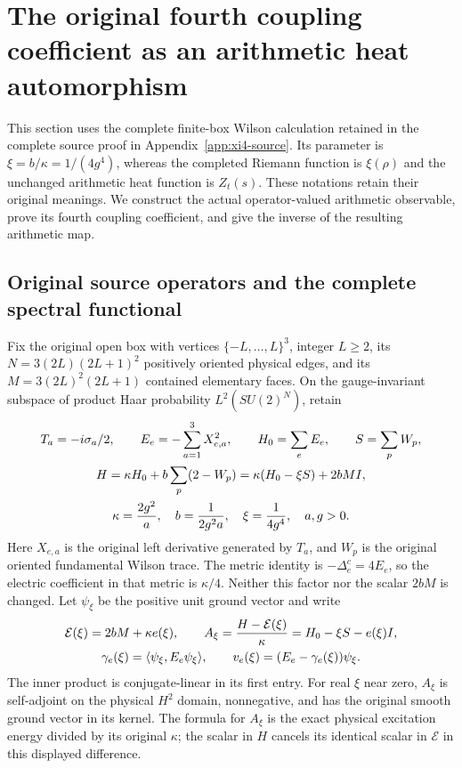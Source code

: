 \section{The original fourth coupling coefficient as an arithmetic heat automorphism}
\label{sec:x4-arithmetic}

This section uses the complete finite-box Wilson calculation retained in
the complete source proof in Appendix~\ref{app:xi4-source}. Its parameter is
\(\xi=b/\kappa=1/(4g^4)\), whereas the completed Riemann function is
\(\xi(\rho)\) and the unchanged arithmetic heat function is \(Z_t(s)\).
These notations retain their original meanings. We construct the actual
operator-valued arithmetic observable, prove its fourth coupling
coefficient, and give the inverse of the resulting arithmetic map.

\subsection{Original source operators and the complete spectral functional}

Fix the original open box with vertices \(\{-L,\ldots,L\}^3\),
integer \(L\geq2\), its \(N=3(2L)(2L+1)^2\) positively oriented
physical edges, and its \(M=3(2L)^2(2L+1)\) contained elementary
faces. On the gauge-invariant subspace of product Haar probability
\(L^2(SU(2)^N)\), retain
\begin{gather}
T_a=-i\sigma_a/2,\qquad E_e=-\sum_{a=1}^3X_{e,a}^2,\qquad
H_0=\sum_eE_e,\qquad S=\sum_pW_p,\notag\\
H=\kappa H_0+b\sum_p(2-W_p)
 =\kappa(H_0-\xi S)+2bMI,\notag\\
\kappa=\frac{2g^2}{a},\quad b=\frac1{2g^2a},\quad
\xi=\frac1{4g^4},\quad a,g>0.
\label{xat:original-H}
\end{gather}
Here \(X_{e,a}\) is the original left derivative generated by
\(T_a\), and \(W_p\) is the original oriented fundamental Wilson
trace. The metric identity is \(-\Delta_e^c=4E_e\), so the electric
coefficient in that metric is \(\kappa/4\). Neither this factor nor
the scalar \(2bM\) is changed. Let \(\psi_\xi\) be the positive
unit ground vector and write
\begin{gather}
\mathcal E(\xi)=2bM+\kappa e(\xi),\qquad
A_\xi=\frac{H-\mathcal E(\xi)}{\kappa}
      =H_0-\xi S-e(\xi)I,\notag\\
\gamma_e(\xi)=\langle\psi_\xi,E_e\psi_\xi\rangle,\qquad
v_e(\xi)=(E_e-\gamma_e(\xi))\psi_\xi.
\label{xat:excitation}
\end{gather}
The inner product is conjugate-linear in its first entry. For real
\(\xi\) near zero, \(A_\xi\) is self-adjoint on the physical
\(H^2\) domain, nonnegative, and has the original smooth ground
vector in its kernel. The formula for \(A_\xi\) is the exact
physical excitation energy divided by its original \(\kappa\);
the scalar in \(H\) cancels its identical scalar in
\(\mathcal E\) in this displayed difference.

